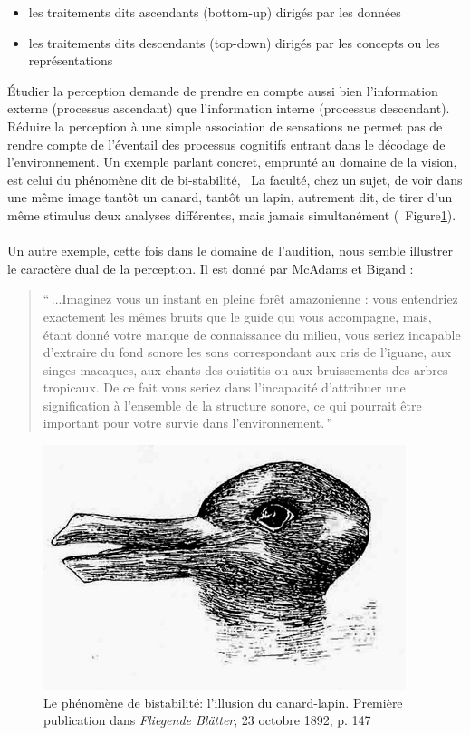 \begin{itemize}
\item les traitements dits ascendants (bottom-up) dirigés par les données
\item les traitements dits descendants (top-down) dirigés par les concepts ou les représentations
\end{itemize}

Étudier la perception demande de prendre en compte aussi bien l'information externe (processus ascendant) que l'information interne (processus descendant). Réduire la perception à une simple association de sensations ne permet pas de rendre compte de l'éventail des processus cognitifs entrant dans le décodage de l'environnement. Un exemple parlant concret, emprunté au domaine de la vision, est celui du phénomène dit de bi-stabilité, \ie~La faculté, chez un sujet, de voir dans une même image tantôt un canard, tantôt un lapin, autrement dit, de tirer d'un même stimulus deux analyses différentes, mais jamais simultanément (\Cf~Figure\ref{fig:bistabilite}). \\

\\

Un autre exemple, cette fois dans le domaine de l'audition, nous semble illustrer le caractère dual de la perception. Il est donné par McAdams et Bigand \citep[p. 2]{mcadams1994penser}:

\begin{quote}
``\,...Imaginez vous un instant en pleine forêt amazonienne : vous entendriez exactement les mêmes bruits que le guide qui vous accompagne, mais, étant donné votre manque de connaissance du milieu, vous seriez incapable d'extraire du fond sonore les sons correspondant aux cris de l'iguane, aux singes macaques, aux chants des ouistitis ou aux bruissements des arbres tropicaux. De ce fait vous seriez dans l'incapacité d'attribuer une signification à l'ensemble de la structure sonore, ce qui pourrait être important pour votre survie dans l'environnement.\,''
\end{quote}

\begin{figure}[bth]
        \myfloatalign
        \includegraphics[width=.6\linewidth]{gfx/canard_lapin}
        \caption[Le phénomène de bistabilité: l'illusion du canard-lapin]{Le phénomène de bistabilité: l'illusion du canard-lapin. Première publication dans \emph{Fliegende Blätter}, 23 octobre 1892, p. 147}\label{fig:bistabilite}
\end{figure}


